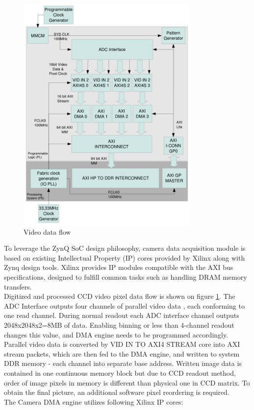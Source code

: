 \begin{figure}[H]
\centering
\includegraphics[width=0.8\textwidth]{pict/przeplyw_danych.png}
\caption{Video data flow}
\label{fig:video_flow}
\end{figure}

To leverage the ZynQ SoC design philosophy, camera data acquisition module is based on existing Intellectual Property (IP) cores provided by Xilinx along with Zynq design tools. Xilinx provides IP modules compatible with the AXI bus specifications, designed to fulfill common tasks such as handling DRAM memory transfers. \\
Digitized and processed CCD video pixel data flow is shown on figure \ref{fig:video_flow}. The ADC Interface outputs four channels of parallel video data , each conforming to one read channel. During normal readout each ADC interface channel outputs 2048x2048x2=8MB of data. Enabling binning or less than 4-channel readout changes this value, and DMA engine needs to be programmed accordingly. Parallel video data is converted by VID IN TO AXI4 STREAM core into AXI stream packets, which are then fed to the DMA engine, and written to system DDR memory - each channel into separate base address. Written image data is contained in one continuous memory block but due to CCD readout method, order of image pixels in memory is different than physical one in CCD matrix. To obtain the final picture, an additional software pixel reordering is required. \\
The Camera DMA engine utilizes following Xilinx IP cores:

